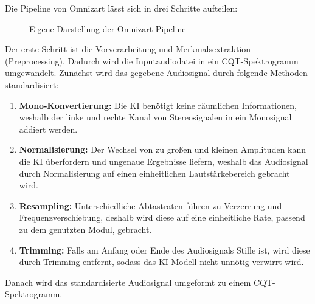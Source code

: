 Die Pipeline von Omnizart lässt sich in drei Schritte aufteilen:
\begin{figure}[H]
    \vspace{1em}
    \vspace{1em}
    \label{fig:omnizart}
    \caption[Omnizart Pipeline]{Eigene Darstellung der Omnizart Pipeline}
\end{figure}

Der erste Schritt ist die Vorverarbeitung und Merkmalsextraktion (Preprocessing).
Dadurch wird die Inputaudiodatei in ein CQT-Spektrogramm umgewandelt.
Zunächst wird das gegebene Audiosignal durch folgende Methoden standardisiert:
\begin{enumerate}
    \item \textbf{Mono-Konvertierung:} Die KI benötigt keine räumlichen Informationen, weshalb der linke und rechte Kanal von Stereosignalen in ein Monosignal addiert werden.
    \item \textbf{Normalisierung:} Der Wechsel von zu großen und kleinen Amplituden kann die KI überfordern und ungenaue Ergebnisse liefern, weshalb das Audiosignal durch Normalisierung auf einen einheitlichen Lautstärkebereich gebracht wird.
    \item \textbf{Resampling:} Unterschiedliche Abtastraten führen zu Verzerrung und Frequenzverschiebung, deshalb wird diese auf eine einheitliche Rate, passend zu dem genutzten Modul, gebracht.
    \item \textbf{Trimming:} Falls am Anfang oder Ende des Audiosignals Stille ist, wird diese durch Trimming entfernt, sodass das KI-Modell nicht unnötig verwirrt wird.
\end{enumerate}
Danach wird das standardisierte Audiosignal umgeformt zu einem CQT-Spektrogramm.

